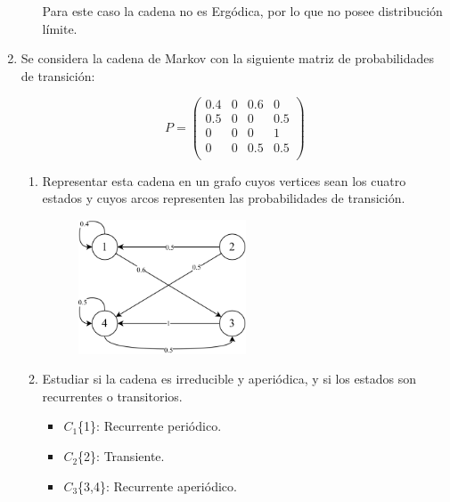 \documentclass{templateNote}
\begin{document}
\begin{enumerate}
\begin{enumerate}[label=\alph*)]
        Para este caso la cadena no es Ergódica, por lo que no posee distribución límite.
    \end{enumerate}

    \newpage
    \item Se considera la cadena de Markov con la siguiente matriz de probabilidades de transición:
    \begin{center}
        \[
        P = 
        \left(
        \begin{array}{cccc}
            0.4 & 0 & 0.6 & 0   \\
            0.5 & 0 & 0   & 0.5 \\
            0   & 0 & 0   & 1   \\
            0   & 0 & 0.5 & 0.5 \\
        \end{array}
        \right)
        \]
    \end{center}
    \begin{enumerate}[label=\alph*)]
        \item Representar esta cadena en un grafo cuyos vertices sean los cuatro estados y cuyos arcos representen las probabilidades de transición.

        \begin{figure}[H]
            \centering
            \includegraphics[width=0.5\textwidth]{img/ejer2.png}
        \end{figure}

        \item Estudiar si la cadena es irreducible y aperiódica, y si los estados son recurrentes o transitorios.

        \begin{itemize}
            \item $C_1$\{1\}: Recurrente periódico.
            \item $C_2$\{2\}: Transiente.
            \item $C_3$\{3,4\}: Recurrente aperiódico.
        \end{itemize}


\end{enumerate}
\end{enumerate}
\end{document}
